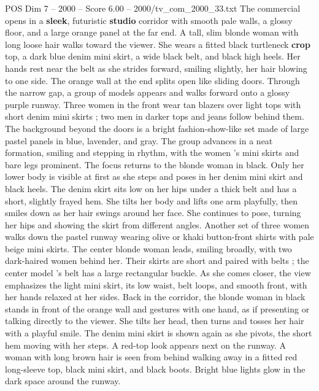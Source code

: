 \begin{textsample}{POS Dim 7 – 2000 – Score 6.00 – 2000/tv\_com\_2000\_33.txt}  \label{ex:f7_pos_077}
The commercial opens in a \textbf{sleek}, futuristic \textbf{studio} corridor with smooth pale walls, a glossy floor, and a large orange panel at the far end.
A tall, slim blonde woman with long loose hair walks toward the viewer.
She wears a fitted black turtleneck \textbf{crop} top, a dark blue denim mini skirt, a wide black belt, and black high heels.
Her hands rest near the belt as she strides forward, smiling slightly, her hair blowing to one side.
The orange wall at the end splits open like sliding doors.
Through the narrow gap, a group of models appears and walks forward onto a glossy purple runway.
Three women in the front wear tan blazers over light tops with short denim mini skirts ; two men in darker tops and jeans follow behind them.
The background beyond the doors is a bright fashion-show-like set made of large pastel panels in blue, lavender, and gray.
The group advances in a neat formation, smiling and stepping in rhythm, with the women ’s mini skirts and bare legs prominent.
The focus returns to the blonde woman in black.
Only her lower body is visible at first as she steps and poses in her denim mini skirt and black heels.
The denim skirt sits low on her hips under a thick belt and has a short, slightly frayed hem.
She tilts her body and lifts one arm playfully, then smiles down as her hair swings around her face.
She continues to pose, turning her hips and showing the skirt from different angles.
Another set of three women walks down the pastel runway wearing olive or khaki button-front shirts with pale beige mini skirts.
The center blonde woman leads, smiling broadly, with two dark-haired women behind her.
Their skirts are short and paired with belts ; the center model ’s belt has a large rectangular buckle.
As she comes closer, the view emphasizes the light mini skirt, its low waist, belt loops, and smooth front, with her hands relaxed at her sides.
Back in the corridor, the blonde woman in black stands in front of the orange wall and gestures with one hand, as if presenting or talking directly to the viewer.
She tilts her head, then turns and tosses her hair with a playful smile.
The denim mini skirt is shown again as she pivots, the short hem moving with her steps.
A red-top look appears next on the runway.
A woman with long brown hair is seen from behind walking away in a fitted red long-sleeve top, black mini skirt, and black boots.
Bright blue lights glow in the dark space around the runway.

\end{textsample}
